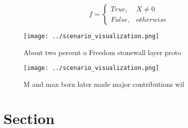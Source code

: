 \documentclass[a4paper]{article}
\begin{document}
\begin{equation}   f =
\begin{cases} True, & X \neq 0\\
False, & otherwise
\end{cases}
\end{equation}

\begin{figure}
\centering
\texttt{[image: ../scenario\_visualization.png]}
\caption{About two percent o Freedom stonewall layer proto
}
\end{figure}
 
\begin{figure}
\centering
\texttt{[image: ../scenario\_visualization.png]}
\caption{M and max born later made major contributions wil
}
\end{figure}
 
\section{Section}
\end{document}
